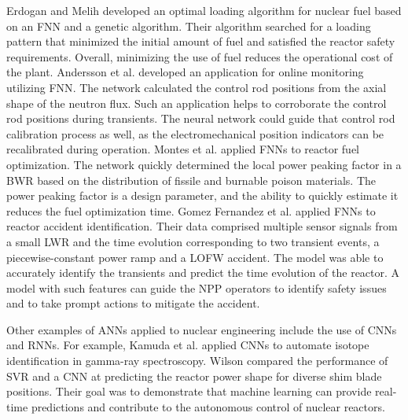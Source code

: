 Erdogan and Melih \cite{erdogan_pwr_2003} developed an optimal loading algorithm for nuclear fuel based on an \gls*{FNN} and a genetic algorithm.
Their algorithm searched for a loading pattern that minimized the initial amount of fuel and satisfied the reactor safety requirements.
Overall, minimizing the use of fuel reduces the operational cost of the plant.
Andersson et al. \cite{andersson_development_2003} developed an application for online monitoring utilizing \gls*{FNN}.
The network calculated the control rod positions from the axial shape of the neutron flux.
Such an application helps to corroborate the control rod positions during transients.
The neural network could guide that control rod calibration process as well, as the electromechanical position indicators can be recalibrated during operation.
Montes et al. \cite{montes_local_2009} applied FNNs to reactor fuel optimization.
The network quickly determined the local power peaking factor in a \gls*{BWR} based on the distribution of fissile and burnable poison materials.
The power peaking factor is a design parameter, and the ability to quickly estimate it reduces the fuel optimization time.
Gomez Fernandez et al. \cite{gomez_fernandez_nuclear_2017} applied FNNs to reactor accident identification.
Their data comprised multiple sensor signals from a small \gls*{LWR} and the time evolution corresponding to two transient events, a piecewise-constant power ramp and a \gls*{LOFW} accident.
The model was able to accurately identify the transients and predict the time evolution of the reactor.
A model with such features can guide the \gls*{NPP} operators to identify safety issues and to take prompt actions to mitigate the accident.

Other examples of \glspl*{ANN} applied to nuclear engineering include the use of \glspl*{CNN} and \glspl*{RNN}.
For example, Kamuda et al. \cite{kamuda_comparison_2018} applied \glspl*{CNN} to automate isotope identification in gamma-ray spectroscopy.
Wilson \cite{wilson_machine_2019} compared the performance of \gls*{SVR} and a CNN at predicting the reactor power shape for diverse shim blade positions.
Their goal was to demonstrate that machine learning can provide real-time predictions and contribute to the autonomous control of nuclear reactors.

